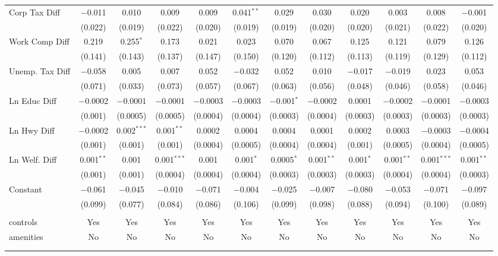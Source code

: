 \begin{table}[!htbp]
\begin{tabular}{@{\extracolsep{5pt}}lccccccccccc}
  Corp Tax Diff & $-$0.011 & 0.010 & 0.009 & 0.009 & 0.041$^{**}$ & 0.029 & 0.030 & 0.020 & 0.003 & 0.008 & $-$0.001 \\ 
  & (0.022) & (0.019) & (0.022) & (0.020) & (0.019) & (0.019) & (0.020) & (0.020) & (0.021) & (0.022) & (0.020) \\ 
  Work Comp Diff & 0.219 & 0.255$^{*}$ & 0.173 & 0.021 & 0.023 & 0.070 & 0.067 & 0.125 & 0.121 & 0.079 & 0.126 \\ 
  & (0.141) & (0.143) & (0.137) & (0.147) & (0.150) & (0.120) & (0.112) & (0.113) & (0.119) & (0.129) & (0.112) \\ 
  Unemp. Tax Diff & $-$0.058 & 0.005 & 0.007 & 0.052 & $-$0.032 & 0.052 & 0.010 & $-$0.017 & $-$0.019 & 0.023 & 0.053 \\ 
  & (0.071) & (0.033) & (0.073) & (0.057) & (0.067) & (0.063) & (0.056) & (0.048) & (0.046) & (0.058) & (0.046) \\ 
  Ln Educ Diff & $-$0.0002 & $-$0.0001 & $-$0.0001 & $-$0.0003 & $-$0.0003 & $-$0.001$^{*}$ & $-$0.0002 & 0.0001 & $-$0.0002 & $-$0.0001 & $-$0.0003 \\ 
  & (0.001) & (0.0005) & (0.0005) & (0.0004) & (0.0004) & (0.0003) & (0.0004) & (0.0003) & (0.0003) & (0.0003) & (0.0003) \\ 
  Ln Hwy Diff & $-$0.0002 & 0.002$^{***}$ & 0.001$^{**}$ & 0.0002 & 0.0004 & 0.0004 & 0.0001 & 0.0002 & 0.0003 & $-$0.0003 & $-$0.0004 \\ 
  & (0.001) & (0.001) & (0.001) & (0.0004) & (0.0005) & (0.0004) & (0.0004) & (0.001) & (0.0005) & (0.0004) & (0.0005) \\ 
  Ln Welf. Diff & 0.001$^{**}$ & 0.001 & 0.001$^{***}$ & 0.001 & 0.001$^{*}$ & 0.0005$^{*}$ & 0.001$^{**}$ & 0.001$^{*}$ & 0.001$^{**}$ & 0.001$^{***}$ & 0.001$^{**}$ \\ 
  & (0.001) & (0.001) & (0.0004) & (0.0004) & (0.0004) & (0.0003) & (0.0003) & (0.0003) & (0.0004) & (0.0004) & (0.0003) \\ 
  Constant & $-$0.061 & $-$0.045 & $-$0.010 & $-$0.071 & $-$0.004 & $-$0.025 & $-$0.007 & $-$0.080 & $-$0.053 & $-$0.071 & $-$0.097 \\ 
  & (0.099) & (0.077) & (0.084) & (0.086) & (0.106) & (0.099) & (0.098) & (0.088) & (0.094) & (0.100) & (0.089) \\ 
 \hline \\[-1.8ex] 
controls & Yes & Yes & Yes & Yes & Yes & Yes & Yes & Yes & Yes & Yes & Yes \\ 
amenities & No & No & No & No & No & No & No & No & No & No & No \\ 
\hline \\[-1.8ex] 
\hline 
\hline \\[-1.8ex] 
\end{tabular} 
\end{table} 
